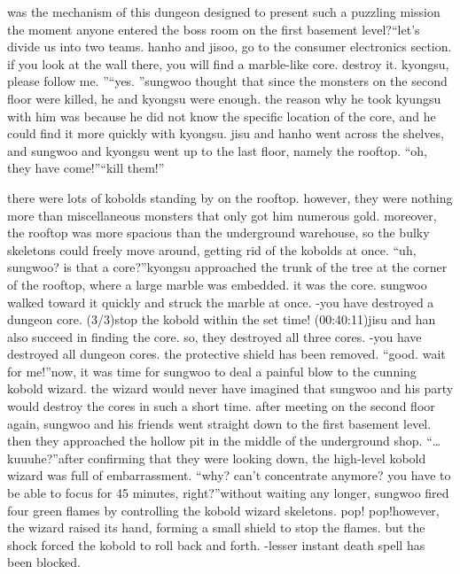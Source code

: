  was the mechanism of this dungeon designed to present such a puzzling mission the moment anyone entered the boss room on the first basement level?“let’s divide us into two teams.
 hanho and jisoo, go to the consumer electronics section.
 if you look at the wall there, you will find a marble-like core.
 destroy it.
 kyongsu, please follow me.
”“yes.
”sungwoo thought that since the monsters on the second floor were killed, he and kyongsu were enough.
 the reason why he took kyungsu with him was because he did not know the specific location of the core, and he could find it more quickly with kyongsu.
 jisu and hanho went across the shelves, and sungwoo and kyongsu went up to the last floor, namely the rooftop.
“oh, they have come!”“kill them!”

there were lots of kobolds standing by on the rooftop.
 however, they were nothing more than miscellaneous monsters that only got him numerous gold.
 moreover, the rooftop was more spacious than the underground warehouse, so the bulky skeletons could freely move around, getting rid of the kobolds at once.
“uh, sungwoo? is that a core?”kyongsu approached the trunk of the tree at the corner of the rooftop, where a large marble was embedded.
 it was the core.
 sungwoo walked toward it quickly and struck the marble at once.
-you have destroyed a dungeon core.
 (3/3)stop the kobold within the set time! (00:40:11)jisu and han also succeed in finding the core.
 so, they destroyed all three cores.
-you have destroyed all dungeon cores.
 the protective shield has been removed.
“good.
 wait for me!”now, it was time for sungwoo to deal a painful blow to the cunning kobold wizard.
 the wizard would never have imagined that sungwoo and his party would destroy the cores in such a short time.
after meeting on the second floor again, sungwoo and his friends went straight down to the first basement level.
 then they approached the hollow pit in the middle of the underground shop.
“…kuuuhe?”after confirming that they were looking down, the high-level kobold wizard was full of embarrassment.
“why? can’t concentrate anymore? you have to be able to focus for 45 minutes, right?”without waiting any longer, sungwoo fired four green flames by controlling the kobold wizard skeletons.
pop! pop!however, the wizard raised its hand, forming a small shield to stop the flames.
but the shock forced the kobold to roll back and forth.
-lesser instant death spell has been blocked.


 
